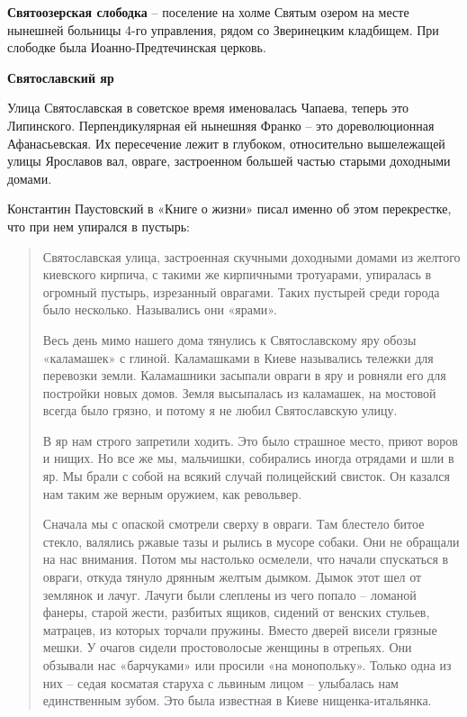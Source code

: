 \medskip

\textbf{Святоозерская слободка} – поселение на холме Святым озером на месте нынешней больницы 4-го управления, рядом со Зверинецким кладбищем. При слободке была Иоанно-Предтечинская церковь.\\

\medskip

\textbf{Святославский яр}

Улица Святославская в советское время именовалась Чапаева, теперь это Липинского. Перпендикулярная ей нынешняя Франко – это дореволюционная Афанасьевская. Их пересечение лежит в глубоком, относительно вышележащей улицы Ярославов вал, овраге, застроенном большей частью старыми доходными домами.

Константин Паустовский в «Книге о жизни» писал именно об этом перекрестке, что при нем упирался в пустырь:

\begin{quotation}
Святославская улица, застроенная скучными доходными домами из желтого киевского кирпича, с такими же кирпичными тротуарами, упиралась в огромный пустырь, изрезанный оврагами. Таких пустырей среди города было несколько. Назывались они «ярами».

Весь день мимо нашего дома тянулись к Святославскому яру обозы «каламашек» с глиной. Каламашками в Киеве назывались тележки для перевозки земли. Каламашники засыпали овраги в яру и ровняли его для постройки новых домов. Земля высыпалась из каламашек, на мостовой всегда было грязно, и потому я не любил Святославскую улицу.

В яр нам строго запретили ходить. Это было страшное место, приют воров и нищих. Но все же мы, мальчишки, собирались иногда отрядами и шли в яр. Мы брали с собой на всякий случай полицейский свисток. Он казался нам таким же верным оружием, как револьвер.

Сначала мы с опаской смотрели сверху в овраги. Там блестело битое стекло, валялись ржавые тазы и рылись в мусоре собаки. Они не обращали на нас внимания. Потом мы настолько осмелели, что начали спускаться в овраги, откуда тянуло дрянным желтым дымком. Дымок этот шел от землянок и лачуг. Лачуги были слеплены из чего попало – ломаной фанеры, старой жести, разбитых ящиков, сидений от венских стульев, матрацев, из которых торчали пружины. Вместо дверей висели грязные мешки. У очагов сидели простоволосые женщины в отрепьях. Они обзывали нас «барчуками» или просили «на монопольку». Только одна из них – седая косматая старуха с львиным лицом – улыбалась нам единственным зубом. Это была известная в Киеве нищенка-итальянка.
\end{quotation}

